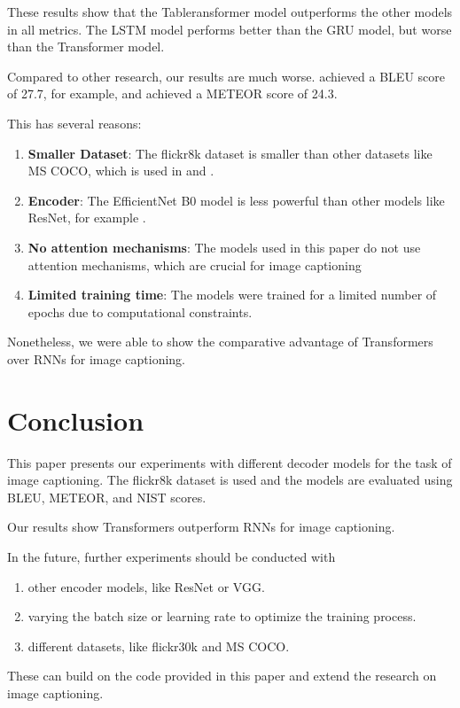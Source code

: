 \documentclass[12pt]{article}
\theoremstyle{plain}
\theoremstyle{definition}
\theoremstyle{remark}
\begin{document}
These results show that the Tableransformer model outperforms the other models in all metrics. The LSTM model performs better than the GRU model, but worse than the Transformer model.
\par Compared to other research, our results are much worse. \cite{vinyals2015show} achieved a BLEU score of  27.7, for example, and \cite{xu2015show} achieved a METEOR score of 24.3.
\par This has several reasons: \begin{enumerate}
    \item \textbf{Smaller Dataset}: The flickr8k dataset is smaller than other datasets like MS COCO, which is used in \cite{vinyals2015show} and \cite{xu2015show}.
    \item \textbf{Encoder}: The EfficientNet B0 model is less powerful than other models like ResNet, for example \cite{he2016deep}.
    \item \textbf{No attention mechanisms}: The models used in this paper do not use attention mechanisms, which are crucial for image captioning \cite{xu2015show}
    \item \textbf{Limited training time}: The models were trained for a limited number of epochs due to computational constraints.
\end{enumerate}
\par Nonetheless, we were able to show the comparative advantage of Transformers over RNNs for image captioning.



\section{Conclusion}\label{sec:conclusion}

This paper presents our experiments with different decoder models for the task of image captioning. The flickr8k dataset is used and the models are evaluated using BLEU, METEOR, and NIST scores.
\par Our results show Transformers outperform RNNs for image captioning.
\par In the future, further experiments should be conducted with
\begin{enumerate}
    \item other encoder models, like ResNet or VGG.
    \item varying the batch size or learning rate to optimize the training process.
    \item different datasets, like flickr30k and MS COCO.
\end{enumerate}
These can build on the code provided in this paper and extend the research on image captioning.



\newpage
\thispagestyle{empty}

\fontsize{12}{14}\selectfont


\end{document}
